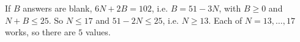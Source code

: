 If $B$ answers are blank, $6N+2B=102$, i.e. $B=51-3N$, with $B\ge0$ and $N+B\le25$. So $N\le17$ and $51-2N\le25$, i.e. $N\ge13$. Each of $N=13,\dots,17$ works, so there are $\boxed{5}$ values.
